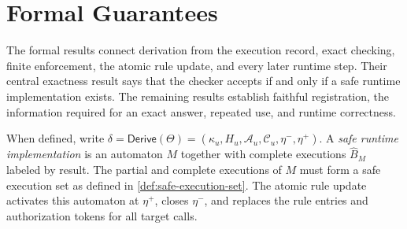 \section{Formal Guarantees}
\label{sec:results}

The formal results connect derivation from the execution record, exact checking, finite enforcement, the atomic rule update, and every later runtime step.
Their central exactness result says that the checker accepts if and only if a safe runtime implementation exists.
The remaining results establish faithful registration, the information required for an exact answer, repeated use, and runtime correctness.

When defined, write
\(\delta=\mathsf{Derive}(\Theta)
 =(\kappa_u,H_u,\mathcal A_u,\mathcal C_u,\eta^-,\eta^+)\).
A \emph{safe runtime implementation} is an automaton \(M\) together with complete executions \(\widehat B_M\) labeled by result.
The partial and complete executions of \(M\) must form a safe execution set as defined in \cref{def:safe-execution-set}.
The atomic rule update activates this automaton at \(\eta^+\), closes \(\eta^-\), and replaces the rule entries and authorization tokens for all target calls.


